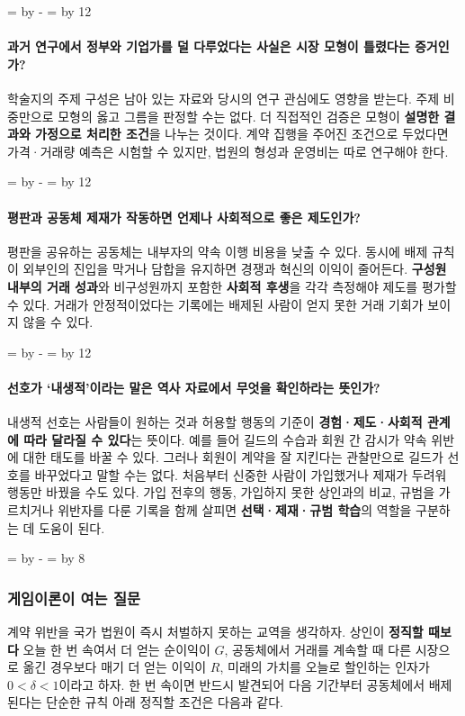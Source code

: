 \documentclass[10pt,a4paper]{article}
\newcommand{\ReserveQuestionSpace}{%
  \par\begingroup
  \dimen0=\pagegoal \advance\dimen0 by -\pagetotal
  \dimen2=\baselineskip \multiply\dimen2 by 12
  \ifdim\dimen0<\dimen2 \newpage\fi
  \endgroup}
\newcommand{\ReserveReadingSectionSpace}{%
  \par\begingroup
  \dimen0=\pagegoal \advance\dimen0 by -\pagetotal
  \dimen2=\baselineskip \multiply\dimen2 by 8
  \ifdim\dimen0<\dimen2 \newpage\fi
  \endgroup}
\begin{document}
\ReserveQuestionSpace
\paragraph{과거 연구에서 정부와 기업가를 덜 다루었다는 사실은 시장 모형이 틀렸다는 증거인가?}
학술지의 주제 구성은 남아 있는 자료와 당시의 연구 관심에도 영향을 받는다. 주제 비중만으로 모형의 옳고 그름을 판정할 수는 없다. 더 직접적인 검증은 모형이 \textbf{설명한 결과와 가정으로 처리한 조건}을 나누는 것이다. 계약 집행을 주어진 조건으로 두었다면 가격·거래량 예측은 시험할 수 있지만, 법원의 형성과 운영비는 따로 연구해야 한다.\par

\ReserveQuestionSpace
\paragraph{평판과 공동체 제재가 작동하면 언제나 사회적으로 좋은 제도인가?}
평판을 공유하는 공동체는 내부자의 약속 이행 비용을 낮출 수 있다. 동시에 배제 규칙이 외부인의 진입을 막거나 담합을 유지하면 경쟁과 혁신의 이익이 줄어든다. \textbf{구성원 내부의 거래 성과}와 비구성원까지 포함한 \textbf{사회적 후생}을 각각 측정해야 제도를 평가할 수 있다. 거래가 안정적이었다는 기록에는 배제된 사람이 얻지 못한 거래 기회가 보이지 않을 수 있다.\par

\ReserveQuestionSpace
\paragraph{선호가 ‘내생적’이라는 말은 역사 자료에서 무엇을 확인하라는 뜻인가?}
내생적 선호는 사람들이 원하는 것과 허용할 행동의 기준이 \textbf{경험·제도·사회적 관계에 따라 달라질 수 있다}는 뜻이다. 예를 들어 길드의 수습과 회원 간 감시가 약속 위반에 대한 태도를 바꿀 수 있다. 그러나 회원이 계약을 잘 지킨다는 관찰만으로 길드가 선호를 바꾸었다고 말할 수는 없다. 처음부터 신중한 사람이 가입했거나 제재가 두려워 행동만 바꿨을 수도 있다. 가입 전후의 행동, 가입하지 못한 상인과의 비교, 규범을 가르치거나 위반자를 다룬 기록을 함께 살피면 \textbf{선택·제재·규범 학습}의 역할을 구분하는 데 도움이 된다.\par

\ReserveReadingSectionSpace
\subsubsection*{게임이론이 여는 질문}

계약 위반을 국가 법원이 즉시 처벌하지 못하는 교역을 생각하자. 상인이 \textbf{정직할 때보다} 오늘 한 번 속여서 더 얻는 순이익이 $G$, 공동체에서 거래를 계속할 때 다른 시장으로 옮긴 경우보다 매기 더 얻는 이익이 $R$, 미래의 가치를 오늘로 할인하는 인자가 $0<\delta<1$이라고 하자. 한 번 속이면 반드시 발견되어 다음 기간부터 공동체에서 배제된다는 단순한 규칙 아래 정직할 조건은 다음과 같다.\par
\end{document}
